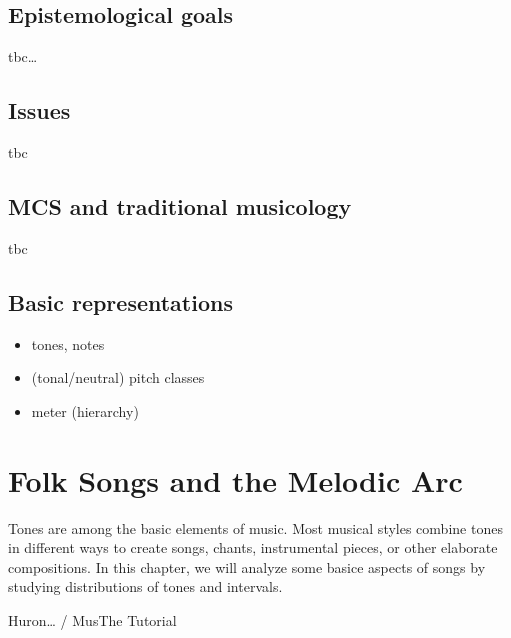 \documentclass[letterpaper,10pt,english]{sphinxmanual}
\begin{document}
\section{Epistemological goals}
\label{\detokenize{2_introduction:epistemological-goals}}
tbc…


\section{Issues}
\label{\detokenize{2_introduction:issues}}
tbc 


\section{MCS and traditional musicology}
\label{\detokenize{2_introduction:mcs-and-traditional-musicology}}
tbc


\section{Basic representations}
\label{\detokenize{2_introduction:basic-representations}}\begin{itemize}
\item {} 
tones, notes

\item {} 
(tonal/neutral) pitch classes

\item {} 
meter (hierarchy)

\end{itemize}


\chapter{Folk Songs and the Melodic Arc}
\label{\detokenize{3_folk_songs:folk-songs-and-the-melodic-arc}}\label{\detokenize{3_folk_songs::doc}}
Tones are among the basic elements of music. Most musical styles combine tones in different ways
to create songs, chants, instrumental pieces, or other elaborate compositions.
In this chapter, we will analyze some basice aspects of songs by studying distributions of tones and intervals.

Huron… / MusThe Tutorial
\end{document}

